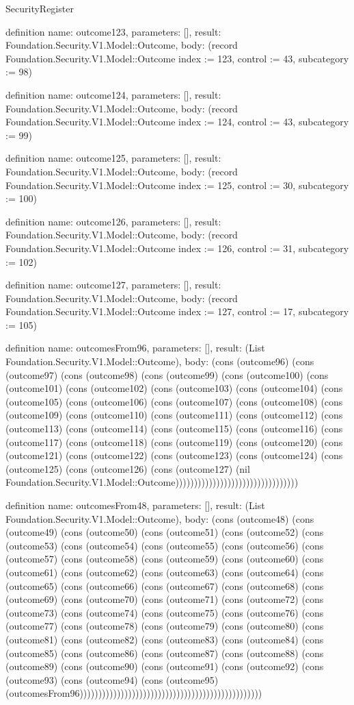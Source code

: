 \begin{lexlean}{SecurityRegister}
\begin{semanticmodule}
definition{
  name: outcome123,
  parameters: [],
  result: Foundation.Security.V1.Model::Outcome,
  body: (record Foundation.Security.V1.Model::Outcome {index := 123, control := 43, subcategory := 98})
}

definition{
  name: outcome124,
  parameters: [],
  result: Foundation.Security.V1.Model::Outcome,
  body: (record Foundation.Security.V1.Model::Outcome {index := 124, control := 43, subcategory := 99})
}

definition{
  name: outcome125,
  parameters: [],
  result: Foundation.Security.V1.Model::Outcome,
  body: (record Foundation.Security.V1.Model::Outcome {index := 125, control := 30, subcategory := 100})
}

definition{
  name: outcome126,
  parameters: [],
  result: Foundation.Security.V1.Model::Outcome,
  body: (record Foundation.Security.V1.Model::Outcome {index := 126, control := 31, subcategory := 102})
}

definition{
  name: outcome127,
  parameters: [],
  result: Foundation.Security.V1.Model::Outcome,
  body: (record Foundation.Security.V1.Model::Outcome {index := 127, control := 17, subcategory := 105})
}

definition{
  name: outcomesFrom96,
  parameters: [],
  result: (List Foundation.Security.V1.Model::Outcome),
  body: (cons (outcome96) (cons (outcome97) (cons (outcome98) (cons (outcome99) (cons (outcome100) (cons (outcome101) (cons (outcome102) (cons (outcome103) (cons (outcome104) (cons (outcome105) (cons (outcome106) (cons (outcome107) (cons (outcome108) (cons (outcome109) (cons (outcome110) (cons (outcome111) (cons (outcome112) (cons (outcome113) (cons (outcome114) (cons (outcome115) (cons (outcome116) (cons (outcome117) (cons (outcome118) (cons (outcome119) (cons (outcome120) (cons (outcome121) (cons (outcome122) (cons (outcome123) (cons (outcome124) (cons (outcome125) (cons (outcome126) (cons (outcome127) (nil Foundation.Security.V1.Model::Outcome)))))))))))))))))))))))))))))))))
}

definition{
  name: outcomesFrom48,
  parameters: [],
  result: (List Foundation.Security.V1.Model::Outcome),
  body: (cons (outcome48) (cons (outcome49) (cons (outcome50) (cons (outcome51) (cons (outcome52) (cons (outcome53) (cons (outcome54) (cons (outcome55) (cons (outcome56) (cons (outcome57) (cons (outcome58) (cons (outcome59) (cons (outcome60) (cons (outcome61) (cons (outcome62) (cons (outcome63) (cons (outcome64) (cons (outcome65) (cons (outcome66) (cons (outcome67) (cons (outcome68) (cons (outcome69) (cons (outcome70) (cons (outcome71) (cons (outcome72) (cons (outcome73) (cons (outcome74) (cons (outcome75) (cons (outcome76) (cons (outcome77) (cons (outcome78) (cons (outcome79) (cons (outcome80) (cons (outcome81) (cons (outcome82) (cons (outcome83) (cons (outcome84) (cons (outcome85) (cons (outcome86) (cons (outcome87) (cons (outcome88) (cons (outcome89) (cons (outcome90) (cons (outcome91) (cons (outcome92) (cons (outcome93) (cons (outcome94) (cons (outcome95) (outcomesFrom96)))))))))))))))))))))))))))))))))))))))))))))))))
}


\end{semanticmodule}
\end{lexlean}
